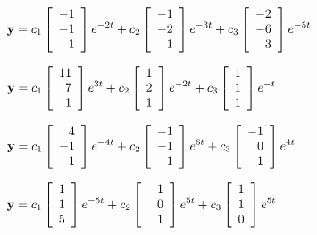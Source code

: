 \smallskip

 ${\bf y}=\displaystyle{c_{1}\left[\begin{array}{r}-1\\-1\\1
\end{array}\right]e^{-2t}+c_{2}\left[\begin{array}{r}-1\\-2\\1
\end{array}
\right]e^{-3t}+c_{3}\left[\begin{array}{r}-2\\-6\\3\end{array}
\right]e^{-5t}}$

\smallskip
{}
 ${\bf y}=\displaystyle{c_{1}\left[\begin{array}{r}11\\\phantom{1}7
\\\phantom{1}1\end{array}\right]e^{3t}+c_{2}\left[\begin{array}{r}1\\2
\\1\end{array}\right]e^{-2t}+c_{3}\left[\begin{array}{r}1\\1\\1
\end{array}\right]e^{-t}}$

\smallskip
{}
 ${\bf y}=\displaystyle{c_{1}\left[\begin{array}{r}4\\-1\\1\end{array}
\right]e^{-4t}+c_{2}\left[\begin{array}{r}-1\\-1\\1
\end{array}\right]e^{6t}+c_{3}\left[\begin{array}{r}-1\\0\\1
\end{array}\right]e^{4t}}$

\smallskip
{}
 ${\bf y}=\displaystyle{c_{1}\left[\begin{array}{r}1\\1\\5
\end{array}\right]e^{-5t}+c_{2}\left[\begin{array}{r}-1\\0\\
 1\end{array}
\right]e^{5t}+c_{3}\left[\begin{array}{r}1\\1\\0\end{array}
\right]e^{5t}}$

